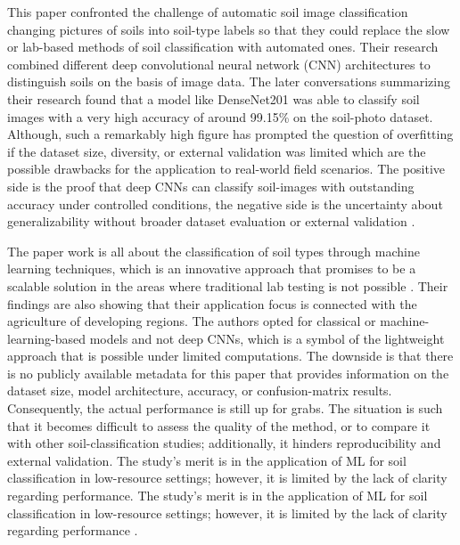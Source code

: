 \documentclass[conference]{IEEEtran}
\begin{document}
This paper confronted the challenge of automatic soil image classification changing pictures of soils into soil-type labels so that they could replace the slow or lab-based methods of soil classification with automated ones. Their research combined different deep convolutional neural network (CNN) architectures to distinguish soils on the basis of image data. The later conversations summarizing their research found that a model like DenseNet201 was able to classify soil images with a very high accuracy of around 99.15\% on the soil-photo dataset. Although, such a remarkably high figure has prompted the question of overfitting if the dataset size, diversity, or external validation was limited which are the possible drawbacks for the application to real-world field scenarios. The positive side is the proof that deep CNNs can classify soil-images with outstanding accuracy under controlled conditions, the negative side is the uncertainty about generalizability without broader dataset evaluation or external validation \cite{b11}.
\vspace{5pt}


The paper work is all about the classification of soil types through machine learning techniques, which is an innovative approach that promises to be a scalable solution in the areas where traditional lab testing is not possible \cite{b12}. Their findings are also showing that their application focus is connected with the agriculture of developing regions. The authors opted for classical or machine-learning-based models and not deep CNNs, which is a symbol of the lightweight approach that is possible under limited computations. The downside is that there is no publicly available metadata for this paper that provides information on the dataset size, model architecture, accuracy, or confusion-matrix results. Consequently, the actual performance is still up for grabs. The situation is such that it becomes difficult to assess the quality of the method, or to compare it with other soil-classification studies; additionally, it hinders reproducibility and external validation. The study's merit is in the application of ML for soil classification in low-resource settings; however, it is limited by the lack of clarity regarding performance. The study's merit is in the application of ML for soil classification in low-resource settings; however, it is limited by the lack of clarity regarding performance \cite{b12}.
\vspace{5pt}
\end{document}

